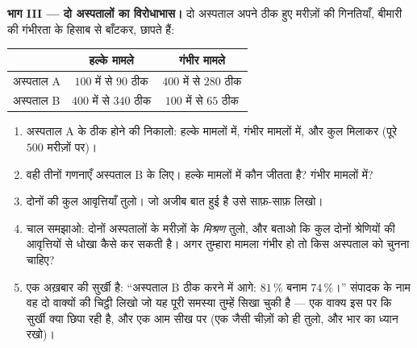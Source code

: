 \begin{problem}[{सप्ताहांत समस्या --- गिनती बनाम आवृत्ति, वह
सर्वेक्षण जिसने पूरे देश को धोखा दिया, और दो अस्पतालों का
विरोधाभास}]
\medskip
\noindent\textbf{भाग III --- दो अस्पतालों का विरोधाभास।}
दो अस्पताल अपने ठीक हुए मरीज़ों की गिनतियाँ, बीमारी की गंभीरता के
हिसाब से बाँटकर, छापते हैं:
\begin{center}
\renewcommand{\arraystretch}{1.3}
\begin{tabular}{l|cc}
 & हल्के मामले & गंभीर मामले \\
\hline
अस्पताल A & $100$ में से $90$ ठीक & $400$ में से $280$ ठीक \\
अस्पताल B & $400$ में से $340$ ठीक & $100$ में से $65$ ठीक \\
\end{tabular}
\end{center}
\begin{enumerate}[resume]
  \item अस्पताल A के ठीक होने की  निकालो: हल्के मामलों
        में, गंभीर मामलों में, और कुल मिलाकर (पूरे $500$ मरीज़ों
        पर)।
  \item वही तीनों गणनाएँ अस्पताल B के लिए। हल्के मामलों में कौन
        जीतता है? गंभीर मामलों में?
  \item दोनों की कुल आवृत्तियाँ तुलो। जो अजीब बात हुई है उसे
        साफ़-साफ़ लिखो।
  \item चाल समझाओ: दोनों अस्पतालों के मरीज़ों के \emph{मिश्रण}
        तुलो, और बताओ कि कुल  दोनों श्रेणियों की
        आवृत्तियों से धोखा कैसे कर सकती है। अगर तुम्हारा मामला
        गंभीर हो तो किस अस्पताल को चुनना चाहिए?
  \item एक अख़बार की सुर्खी है: ``अस्पताल B ठीक करने में आगे:
        $81\,\%$ बनाम $74\,\%$।'' संपादक के नाम वह दो वाक्यों की
        चिट्ठी लिखो जो यह पूरी समस्या तुम्हें सिखा चुकी है ---
        एक वाक्य इस पर कि सुर्खी क्या छिपा रही है, और एक आम सीख
        पर (एक जैसी चीज़ों को ही तुलो, और भार का ध्यान रखो)।
\end{enumerate}
\end{problem}
